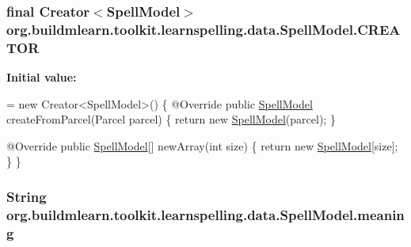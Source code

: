 \subsubsection[{\texorpdfstring{C\+R\+E\+A\+T\+OR}{CREATOR}}]{\setlength{\rightskip}{0pt plus 5cm}final Creator$<${\bf Spell\+Model}$>$ org.\+buildmlearn.\+toolkit.\+learnspelling.\+data.\+Spell\+Model.\+C\+R\+E\+A\+T\+OR\hspace{0.3cm}{\ttfamily [static]}}\hypertarget{classorg_1_1buildmlearn_1_1toolkit_1_1learnspelling_1_1data_1_1SpellModel_af45eb4643be2e123379c5e259fb510a0}{}\label{classorg_1_1buildmlearn_1_1toolkit_1_1learnspelling_1_1data_1_1SpellModel_af45eb4643be2e123379c5e259fb510a0}
{\bfseries Initial value\+:}
\begin{DoxyCode}
= \textcolor{keyword}{new} Creator<SpellModel>() \{
        @Override
        \textcolor{keyword}{public} \hyperlink{classorg_1_1buildmlearn_1_1toolkit_1_1learnspelling_1_1data_1_1SpellModel_a542abb6027c0ee13b336969d38f0fa6f}{SpellModel} createFromParcel(Parcel parcel) \{
            \textcolor{keywordflow}{return} \textcolor{keyword}{new} \hyperlink{classorg_1_1buildmlearn_1_1toolkit_1_1learnspelling_1_1data_1_1SpellModel_a542abb6027c0ee13b336969d38f0fa6f}{SpellModel}(parcel);
        \}

        @Override
        \textcolor{keyword}{public} \hyperlink{classorg_1_1buildmlearn_1_1toolkit_1_1learnspelling_1_1data_1_1SpellModel_a542abb6027c0ee13b336969d38f0fa6f}{SpellModel}[] newArray(\textcolor{keywordtype}{int} size) \{
            \textcolor{keywordflow}{return} \textcolor{keyword}{new} \hyperlink{classorg_1_1buildmlearn_1_1toolkit_1_1learnspelling_1_1data_1_1SpellModel_a542abb6027c0ee13b336969d38f0fa6f}{SpellModel}[size];
        \}
    \}
\end{DoxyCode}
\subsubsection[{\texorpdfstring{meaning}{meaning}}]{\setlength{\rightskip}{0pt plus 5cm}String org.\+buildmlearn.\+toolkit.\+learnspelling.\+data.\+Spell\+Model.\+meaning\hspace{0.3cm}{\ttfamily [private]}}\hypertarget{classorg_1_1buildmlearn_1_1toolkit_1_1learnspelling_1_1data_1_1SpellModel_a536f8124344acad265bc0b8fa5e13752}{}\label{classorg_1_1buildmlearn_1_1toolkit_1_1learnspelling_1_1data_1_1SpellModel_a536f8124344acad265bc0b8fa5e13752}
